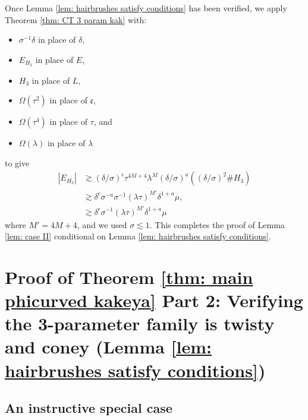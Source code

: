 \documentclass[12pt]{amsart}
\numberwithin{equation}{section}
\newcommand{\1}{\mathbbm{1}}
\begin{document}
Once Lemma \ref{lem: hairbrushes satisfy conditions} has been verified, we apply Theorem \ref{thm: CT 3 param kak} with:
\begin{itemize}
    \item $\sigma^{-1} \delta$ in place of $\delta$,
    \item $E_{H_3}$ in place of $E$,
    \item $H_3$ in place of $L$,
    \item $\Omega(\tau^2)$ in place of $\mathfrak c$,
    \item $\Omega(\tau^4)$ in place of $\tau$, and
    \item $\Omega(\lambda)$ in place of $\lambda$
\end{itemize}
to give 
\begin{align}
    |E_{H_3}| &\gtrsim (\delta / \sigma)^\epsilon \tau^{4M + 4} \lambda^M (\delta / \sigma)^a ((\delta /\sigma)^2 \# H_3) \\
    &\gtrsim \delta^{\epsilon} \sigma^{-a} \sigma^{-1} (\lambda \tau)^{M'} \delta^{1 + a} \mu, \\
    &\gtrsim \delta^\epsilon \sigma^{-1}(\lambda \tau)^{M'} \delta^{1+a} \mu
\end{align}
where $M' = 4M + 4$, and we used $\sigma \lesssim 1$. This completes the proof of Lemma \ref{lem: case II} conditional on Lemma \ref{lem: hairbrushes satisfy conditions}. 


\section{Proof of Theorem \ref{thm: main phicurved kakeya} Part 2: Verifying the 3-parameter family is twisty and coney (Lemma \ref{lem: hairbrushes satisfy conditions})}\label{sec: 8}


\subsection{An instructive special case}
\end{document}
